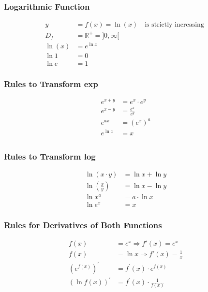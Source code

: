 \begin{minipage}{0.5\textwidth}
\subsubsection*{Logarithmic Function}
\begin{align*}
	y&=f(x)=\ln(x) \quad \text{is strictly increasing } \\
	D_f&=\mathbb R^+=]0,\infty[\\
	\ln(x)&=e^{\ln x}\\
	\ln 1&= 0\\
	\ln e&= 1
\end{align*}
\end{minipage}
\begin{minipage}{0.5\textwidth}
	
\subsubsection*{Rules to Transform exp}
\begin{align*}
	e^{x+y}&=e^x\cdot e^y\\
	e^{x-y}&=\frac{e^x}{e^y}\\
	e^{ax}&=(e^x)^a\\
	e^{\ln x}&=x\\
\end{align*}
\end{minipage}
\begin{minipage}{0.5\textwidth}
	
\subsubsection*{Rules to Transform log}
\begin{align*}
	\ln(x\cdot y)&=\ln x + \ln y\\
	\ln(\frac{x}{y})&=\ln x - \ln y\\
	\ln x^a&=a\cdot \ln x\\
	\ln e^x&= x
\end{align*}
\end{minipage}
\begin{minipage}{0.5\textwidth}
	
\subsubsection*{Rules for Derivatives of Both Functions}
\begin{align*}
	f(x)&=e^x \Rightarrow f'(x)=e^x\\
	f(x)&=\ln x \Rightarrow f'(x)=\frac{1}{x}\\
	\left(e^{f(x)}\right)^{\prime}&=f^{\prime}(x) \cdot e^{f(x)}\\
	(\ln f(x))^{\prime}&=f^{\prime}(x) \cdot \frac{1}{f(x)}
\end{align*}
\end{minipage}





